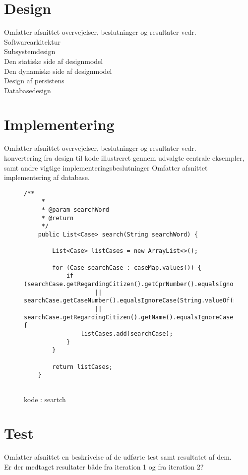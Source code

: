 \section{Design}
Omfatter afsnittet overvejelser, beslutninger og resultater vedr.\\
Softwarearkitektur\\
Subsystemdesign\\
Den statiske side af designmodel\\
Den dynamiske side af designmodel\\
Design af persistens\\
Databasedesign\\
\section{Implementering}
Omfatter afsnittet overvejelser, beslutninger og resultater vedr.\\  konvertering fra design til kode illustreret gennem udvalgte centrale eksempler, samt andre vigtige implementeringsbeslutninger
Omfatter afsnittet implementering af database.


\begin{figure}
\begin{lstlisting}
/**
     *
     * @param searchWord
     * @return
     */
    public List<Case> search(String searchWord) {

        List<Case> listCases = new ArrayList<>();

        for (Case searchCase : caseMap.values()) {
            if (searchCase.getRegardingCitizen().getCprNumber().equalsIgnoreCase(searchWord)
                    || searchCase.getCaseNumber().equalsIgnoreCase(String.valueOf(searchWord))
                    || searchCase.getRegardingCitizen().getName().equalsIgnoreCase(searchWord)) {
                listCases.add(searchCase);
            }
        }

        return listCases;
    }


\end{lstlisting}
\caption{kode : seartch}
\label{kode:Search}
\end{figure}


\section{Test}
Omfatter afsnittet en beskrivelse af de udførte test samt resultatet af dem.\\
Er der medtaget resultater både fra iteration 1 og fra iteration 2?\\
